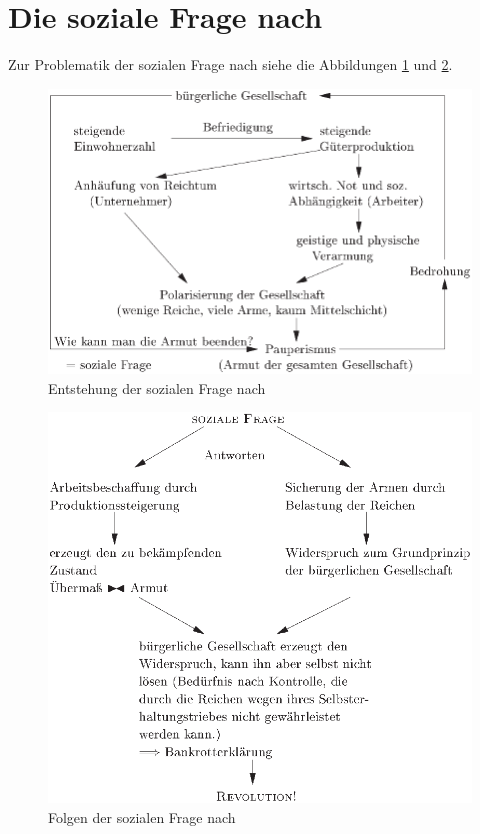 \section[Die soziale Frage nach \Nam{}{Hegel}]
{Die soziale Frage nach }
\label{sec:soz-frag-heg}

Zur Problematik der sozialen Frage nach  siehe die Abbildungen
\ref{pic:soz-frag-sch} und \ref{pic:soz-frag-sch-rev}.

\begin{figure}
\includegraphics[width=\textwidth]{soz-frag-sch.eps}
\caption{Entstehung der sozialen Frage nach }
\label{pic:soz-frag-sch}
\end{figure}

\begin{figure}
\includegraphics[width=\textwidth]{soz-frag-sch-rev.eps}
\caption{Folgen der sozialen Frage nach }
\label{pic:soz-frag-sch-rev}
\end{figure}

\endinput
